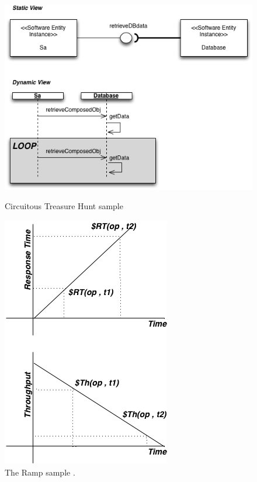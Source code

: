 \documentclass{bmcart}
\begin{document}
\begin{backmatter}
\begin{figure}[h!]
\begin{minipage}{.5\textwidth}
\centering
\includegraphics{./images/circuit.png}
\caption{Circuitous
Treasure Hunt sample \citep{Vetoio2011}}
\label{fig:circuit}
\end{minipage}
\begin{minipage}{.5\textwidth}
\centering
\includegraphics{./images/ramp.png}
\caption{The Ramp sample \citep{Vetoio2011}.}
\label{fig:ramp}
\end{minipage}
\end{figure}



\end{backmatter}
\end{document}
